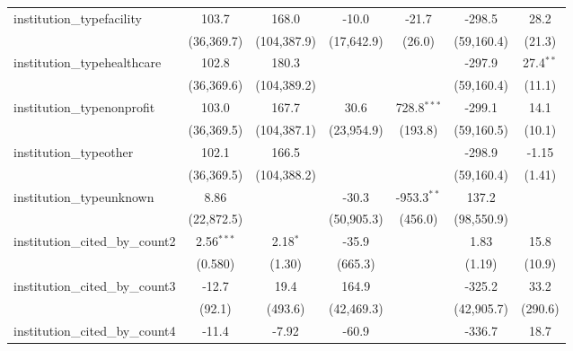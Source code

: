 \begin{tabular}{lcccccc}
   institution\_typefacility             & 103.7         & 168.0        & -10.0         & -21.7          & -298.5        & 28.2\\   
                                         & (36,369.7)    & (104,387.9)  & (17,642.9)    & (26.0)         & (59,160.4)    & (21.3)\\   
   institution\_typehealthcare           & 102.8         & 180.3        &               &                & -297.9        & 27.4$^{**}$\\   
                                         & (36,369.6)    & (104,389.2)  &               &                & (59,160.4)    & (11.1)\\   
   institution\_typenonprofit            & 103.0         & 167.7        & 30.6          & 728.8$^{***}$  & -299.1        & 14.1\\   
                                         & (36,369.5)    & (104,387.1)  & (23,954.9)    & (193.8)        & (59,160.5)    & (10.1)\\   
   institution\_typeother                & 102.1         & 166.5        &               &                & -298.9        & -1.15\\   
                                         & (36,369.5)    & (104,388.2)  &               &                & (59,160.4)    & (1.41)\\   
   institution\_typeunknown              & 8.86          &              & -30.3         & -953.3$^{**}$  & 137.2         &   \\   
                                         & (22,872.5)    &              & (50,905.3)    & (456.0)        & (98,550.9)    &   \\   
   institution\_cited\_by\_count2        & 2.56$^{***}$  & 2.18$^{*}$   & -35.9         &                & 1.83          & 15.8\\   
                                         & (0.580)       & (1.30)       & (665.3)       &                & (1.19)        & (10.9)\\   
   institution\_cited\_by\_count3        & -12.7         & 19.4         & 164.9         &                & -325.2        & 33.2\\   
                                         & (92.1)        & (493.6)      & (42,469.3)    &                & (42,905.7)    & (290.6)\\   
   institution\_cited\_by\_count4        & -11.4         & -7.92        & -60.9         &                & -336.7        & 18.7\\   

\end{tabular}
